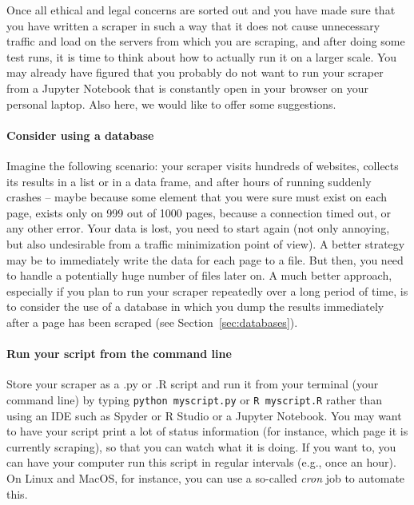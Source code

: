 Once all ethical and legal concerns are sorted out and you have made sure that you have written a scraper in such a way that it does not cause unnecessary traffic and load on the servers from which you are scraping, and after doing some test runs, it is time to think about how to actually run it on a larger scale. You may already have figured that you probably do not want to run your scraper from a Jupyter Notebook that is constantly open in your browser on your personal laptop. Also here, we would like to offer some suggestions.

\paragraph{Consider using a database} Imagine the following scenario: your scraper visits hundreds of websites, collects its results in a list or in a data frame, and after hours of running suddenly crashes -- maybe because some element that you were sure must exist on each page,  exists only on 999 out of 1000 pages, because a connection timed out, or any other error. Your data is lost, you need to start again (not only annoying, but also undesirable from a traffic minimization point of view). A better strategy may be to immediately write the data for each page  to a file. But then, you need to handle a potentially huge number of files later on. A much better approach, especially if you plan to run your scraper repeatedly over a long period of time, is to consider the use of a database in which you dump the results immediately after a page has been scraped (see Section~\ref{sec:databases}).

\paragraph{Run your script from the command line} Store your scraper as a .py or .R script and run it from your terminal (your command line) by typing \verb|python myscript.py| or \verb|R myscript.R| rather than using an IDE such as Spyder or R Studio or a Jupyter Notebook. You may want to have your script print a lot of status information (for instance, which page it is currently scraping), so that you can watch what it is doing. If you want to, you can have your computer run this script in regular intervals (e.g., once an hour). On Linux and MacOS, for instance, you can use a so-called \emph{cron} job to automate this.

